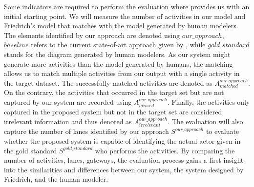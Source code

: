 Some indicators are required to perform the evaluation where \cite{t2m_1_successor} provides us with an initial starting point. We will measure the number of activities in our model and Friedrich's model \cite{t2m_1_main} that matches with the model generated by human modelers. The elements identified by our approach are denoted using $our\_approach$, $baseline$ refers to the current state-of-art approach given by \cite{t2m_1}, while $gold\_standard$ stands for the diagram generated by human modelers. As our system might generate more activities than the model generated by humans, the matching allows us to match multiple activities from our output with a single activity in the target dataset. The successfully matched activities are denoted as $A^{our\_approach}_{matched}$. On the contrary, the activities that occurred in the target set but are not captured by our system are recorded using $A^{our\_approach}_{missed}$. Finally, the activities only captured in the proposed system but not in the target set are considered irrelevant information and thus denoted as $A^{our\_approach}_{irrelevant}$. The evaluation will also capture the number of lanes identified by our approach $S^{our\_approach}$ to evaluate whether the proposed system is capable of identifying the actual actor given in the gold standard $S^{gold\_standard}$ who performs the activities. By comparing the number of activities, lanes, gateways, the evaluation process gains a first insight into the similarities and differences between our system, the system designed by Friedrich, and the human modeler.  

